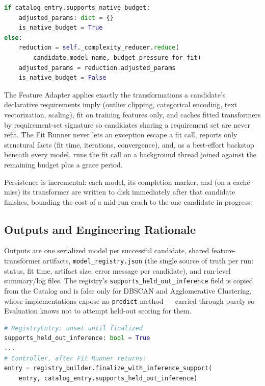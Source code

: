\begin{lstlisting}[language=Python, caption={The Controller's sole routing decision (Patch 1): native budget vs.\ Complexity Reducer.}, label={lst:training-routing}]
if catalog_entry.supports_native_budget:
    adjusted_params: dict = {}
    is_native_budget = True
else:
    reduction = self._complexity_reducer.reduce(
        candidate.model_name, budget_pressure_for_fit)
    adjusted_params = reduction.adjusted_params
    is_native_budget = False
\end{lstlisting}

The Feature Adapter applies exactly the transformations a candidate's declarative requirements imply (outlier clipping, categorical encoding, text vectorization, scaling), fit on training features only, and caches fitted transformers by requirement-set signature so candidates sharing a requirement set are never refit. The Fit Runner never lets an exception escape a fit call, reports only structural facts (fit time, iterations, convergence), and, as a best-effort backstop beneath every model, runs the fit call on a background thread joined against the remaining budget plus a grace period.

Persistence is incremental: each model, its completion marker, and (on a cache miss) its transformer are written to disk immediately after that candidate finishes, bounding the cost of a mid-run crash to the one candidate in progress.

\subsection{Outputs and Engineering Rationale}
\label{subsec:training-outputs}

Outputs are one serialized model per successful candidate, shared feature-transformer artifacts, \texttt{model\_registry.json} (the single source of truth per run: status, fit time, artifact size, error message per candidate), and run-level summary/log files. The registry's \texttt{supports\_held\_out\_inference} field is copied from the Catalog and is false only for DBSCAN and Agglomerative Clustering, whose implementations expose no \texttt{predict} method --- carried through purely so Evaluation knows not to attempt held-out scoring for them.

\begin{lstlisting}[language=Python, caption={\texttt{supports\_held\_out\_inference} defaults to \texttt{True} on build, then is copied verbatim from the Catalog.}, label={lst:training-registry-entry}]
# RegistryEntry: unset until finalized
supports_held_out_inference: bool = True
...
# Controller, after Fit Runner returns:
entry = registry_builder.finalize_with_inference_support(
    entry, catalog_entry.supports_held_out_inference)
\end{lstlisting}

